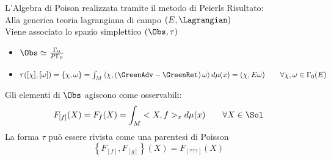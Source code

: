 \documentclass[8pt,handout]{beamer}
\begin{document}
	\begin{frame}{L'Algebra di Poison realizzata tramite il metodo di Peierls}
		Risultato:\\
		Alla generica teoria lagrangiana di campo $(E, \Lagrangian)$\\
		Viene associato lo spazio simplettico  $(\Obs, \tau)$ 
		\begin{itemize}
			\item $\Obs \simeq \frac{\Gamma_0}{P \Gamma_0} $
			\item $\tau( [\chi], [\omega]) = \{\chi , \omega \} =\int_M \left\langle\chi, \left(\GreenAdv - \GreenRet \right)\omega \right\rangle 
			d\mu(x) = ( \chi, E \omega) \qquad \forall \chi,\omega \in \Gamma_0(E)$
		\end{itemize}

		\vfill

		Gli elementi di $\Obs$ agiscono come osservabili:
				\begin{displaymath}
				 F_{[f]}(X) = F_f (X)= \int_M <X, f>_x d\mu(x) \qquad \forall X \in \Sol
				\end{displaymath}
		La forma $\tau$ può essere rivista come una parentesi di Poisson
				\begin{displaymath}
				 \left\{ F_{[f]},  F_{[g]} \right\} (X) = F_{[???]}(X)
				\end{displaymath}
			
	\end{frame}


	
\end{document}
